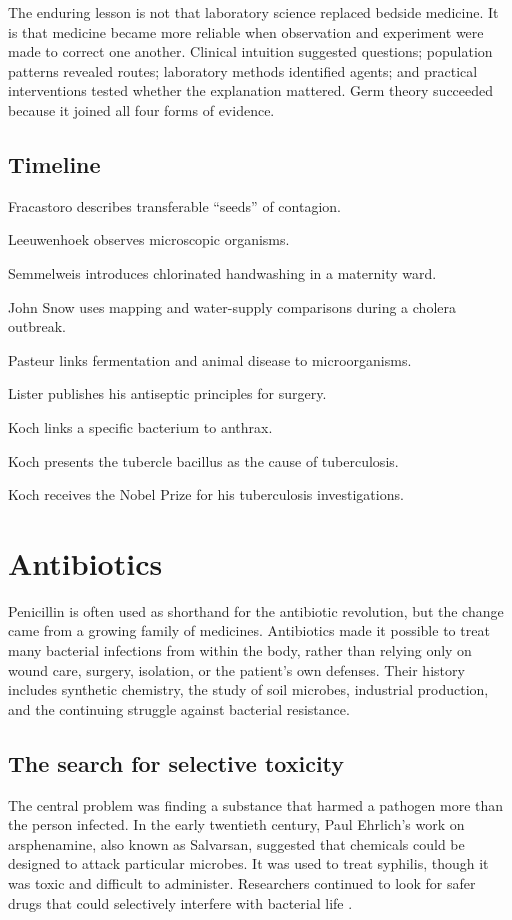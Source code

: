 \documentclass[12pt,oneside]{book}
\begin{document}
The enduring lesson is not that laboratory science replaced bedside medicine.
It is that medicine became more reliable when observation and experiment were
made to correct one another. Clinical intuition suggested questions; population
patterns revealed routes; laboratory methods identified agents; and practical
interventions tested whether the explanation mattered. Germ theory succeeded
because it joined all four forms of evidence.

\section*{Timeline}
\begin{description}[leftmargin=2.3cm,style=nextline]
  \item[1546] Fracastoro describes transferable ``seeds'' of contagion.
  \item[1670s] Leeuwenhoek observes microscopic organisms.
  \item[1847] Semmelweis introduces chlorinated handwashing in a maternity ward.
  \item[1854] John Snow uses mapping and water-supply comparisons during a cholera outbreak.
  \item[1860s--1870s] Pasteur links fermentation and animal disease to microorganisms.
  \item[1867] Lister publishes his antiseptic principles for surgery.
  \item[1876] Koch links a specific bacterium to anthrax.
  \item[1882] Koch presents the tubercle bacillus as the cause of tuberculosis.
  \item[1905] Koch receives the Nobel Prize for his tuberculosis investigations.
\end{description}
\chapter[Antibiotics]{Antibiotics}

Penicillin is often used as shorthand for the antibiotic revolution, but the
change came from a growing family of medicines. Antibiotics made it possible
to treat many bacterial infections from within the body, rather than relying
only on wound care, surgery, isolation, or the patient's own defenses. Their
history includes synthetic chemistry, the study of soil microbes, industrial
production, and the continuing struggle against bacterial resistance.

\section{The search for selective toxicity}
The central problem was finding a substance that harmed a pathogen more than
the person infected. In the early twentieth century, Paul Ehrlich's work on
arsphenamine, also known as Salvarsan, suggested that chemicals could be
designed to attack particular microbes. It was used to treat syphilis, though
it was toxic and difficult to administer. Researchers continued to look for
safer drugs that could selectively interfere with bacterial life
\cite{antibioticEraReview}.
\end{document}

